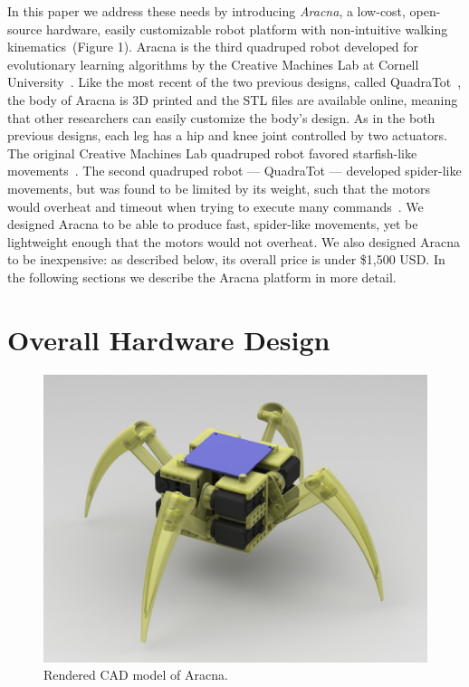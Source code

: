 \documentclass[letterpaper]{article}
\begin{document}
In this paper we address these needs by introducing \emph{Aracna}, a low-cost, open-source hardware, easily customizable robot platform with non-intuitive walking
kinematics~(Figure 1). Aracna is the third quadruped robot developed for evolutionary learning algorithms by the Creative Machines Lab at Cornell University~\citep{bongard2006resilient, yosinski2011gaits}. Like the most recent of the two previous designs, called QuadraTot~\citep{yosinski2011gaits}, the body of Aracna is 3D printed and the STL files are available online,
meaning that other researchers can easily customize the body's design. As in the both previous designs, each leg has a hip and knee joint controlled by two actuators. The original Creative
Machines Lab quadruped robot favored starfish-like movements~\citep{bongard2006resilient}. The second quadruped robot --- QuadraTot ---
developed spider-like movements, but was found to be limited by its
weight, such that the motors would overheat and timeout when trying to execute many commands~\citep{yosinski2011gaits, Glette2012Evolution}. We designed Aracna to be able to produce fast, spider-like movements, yet be lightweight enough that the motors would not overheat. We also designed Aracna to be inexpensive: as described below, its overall price is under \$1,500  USD. In the following sections we describe the Aracna platform in more detail. 




\section{Overall Hardware Design}

\begin{figure}[t]
\begin{center}
\includegraphics[width=\columnwidth]{fig5.jpg}
\caption{Rendered CAD model of Aracna.}
\label{cadModelOfRobot}
\end{center}
\end{figure}
\end{document}
